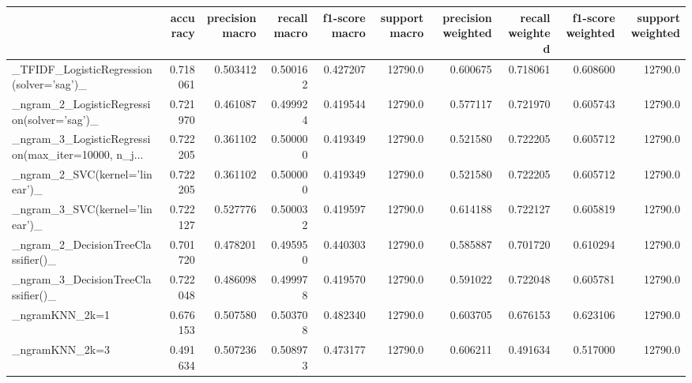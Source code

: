 \begin{tabular}{lrrrrrrrrr}
\toprule
{} &  accuracy &  precision macro &  recall macro &  f1-score macro &  support macro &  precision weighted &  recall weighted &  f1-score weighted &  support weighted \\
\midrule
\_TFIDF\_LogisticRegression(solver='sag')\_           &  0.718061 &         0.503412 &      0.500162 &        0.427207 &        12790.0 &            0.600675 &         0.718061 &           0.608600 &           12790.0 \\
\_ngram\_2\_LogisticRegression(solver='sag')\_         &  0.721970 &         0.461087 &      0.499924 &        0.419544 &        12790.0 &            0.577117 &         0.721970 &           0.605743 &           12790.0 \\
\_ngram\_3\_LogisticRegression(max\_iter=10000, n\_j... &  0.722205 &         0.361102 &      0.500000 &        0.419349 &        12790.0 &            0.521580 &         0.722205 &           0.605712 &           12790.0 \\
\_ngram\_2\_SVC(kernel='linear')\_                     &  0.722205 &         0.361102 &      0.500000 &        0.419349 &        12790.0 &            0.521580 &         0.722205 &           0.605712 &           12790.0 \\
\_ngram\_3\_SVC(kernel='linear')\_                     &  0.722127 &         0.527776 &      0.500032 &        0.419597 &        12790.0 &            0.614188 &         0.722127 &           0.605819 &           12790.0 \\
\_ngram\_2\_DecisionTreeClassifier()\_                 &  0.701720 &         0.478201 &      0.495950 &        0.440303 &        12790.0 &            0.585887 &         0.701720 &           0.610294 &           12790.0 \\
\_ngram\_3\_DecisionTreeClassifier()\_                 &  0.722048 &         0.486098 &      0.499978 &        0.419570 &        12790.0 &            0.591022 &         0.722048 &           0.605781 &           12790.0 \\
\_ngramKNN\_2k=1                                     &  0.676153 &         0.507580 &      0.503708 &        0.482340 &        12790.0 &            0.603705 &         0.676153 &           0.623106 &           12790.0 \\
\_ngramKNN\_2k=3                                     &  0.491634 &         0.507236 &      0.508973 &        0.473177 &        12790.0 &            0.606211 &         0.491634 &           0.517000 &           12790.0 \\

\end{tabular}
